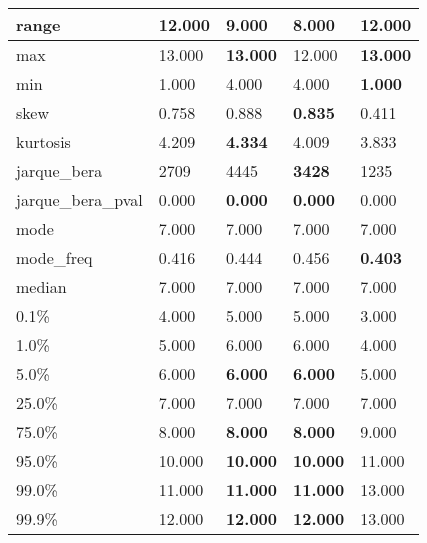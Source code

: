 \begin{table}[H]
\begin{tabular}{|l|m{10em}|m{10em}|m{10em}|m{10em}|}
\hline range & 12.000 & 9.000 & \cellcolor[rgb]{0.9, 0.54, 0.52} 8.000 & \bfseries 12.000 \\
\hline max & 13.000 & \bfseries 13.000 & \cellcolor[rgb]{0.9, 0.54, 0.52} 12.000 & \bfseries 13.000 \\
\hline min & 1.000 & \cellcolor[rgb]{0.9, 0.54, 0.52} 4.000 & \cellcolor[rgb]{0.9, 0.54, 0.52} 4.000 & \bfseries 1.000 \\
\hline skew & 0.758 & 0.888 & \bfseries 0.835 & \cellcolor[rgb]{0.9, 0.54, 0.52} 0.411 \\
\hline kurtosis & 4.209 & \bfseries 4.334 & 4.009 & \cellcolor[rgb]{0.9, 0.54, 0.52} 3.833 \\
\hline jarque\_bera & 2709 & \cellcolor[rgb]{0.9, 0.54, 0.52} 4445 & \bfseries 3428 & 1235 \\
\hline jarque\_bera\_pval & 0.000 & \bfseries 0.000 & \bfseries 0.000 & \cellcolor[rgb]{0.9, 0.54, 0.52} 0.000 \\
\hline mode & 7.000 & 7.000 & 7.000 & 7.000 \\
\hline mode\_freq & 0.416 & 0.444 & \cellcolor[rgb]{0.9, 0.54, 0.52} 0.456 & \bfseries 0.403 \\
\hline median & 7.000 & 7.000 & 7.000 & 7.000 \\
\hline 0.1\% & 4.000 & 5.000 & 5.000 & 3.000 \\
\hline 1.0\% & 5.000 & 6.000 & 6.000 & 4.000 \\
\hline 5.0\% & 6.000 & \bfseries 6.000 & \bfseries 6.000 & \cellcolor[rgb]{0.9, 0.54, 0.52} 5.000 \\
\hline 25.0\% & 7.000 & 7.000 & 7.000 & 7.000 \\
\hline 75.0\% & 8.000 & \bfseries 8.000 & \bfseries 8.000 & \cellcolor[rgb]{0.9, 0.54, 0.52} 9.000 \\
\hline 95.0\% & 10.000 & \bfseries 10.000 & \bfseries 10.000 & \cellcolor[rgb]{0.9, 0.54, 0.52} 11.000 \\
\hline 99.0\% & 11.000 & \bfseries 11.000 & \bfseries 11.000 & \cellcolor[rgb]{0.9, 0.54, 0.52} 13.000 \\
\hline 99.9\% & 12.000 & \bfseries 12.000 & \bfseries 12.000 & \cellcolor[rgb]{0.9, 0.54, 0.52} 13.000 \\
\hline
\end{tabular}
\end{table}

